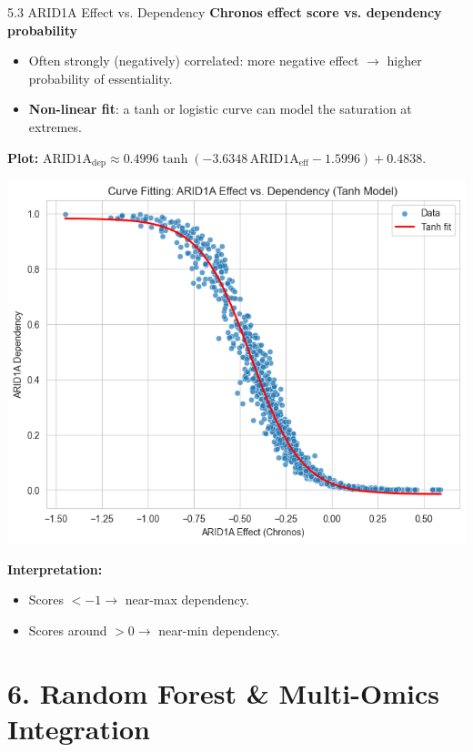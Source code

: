 \documentclass[10pt]{beamer}
\begin{document}
\begin{frame}{5.3 ARID1A Effect vs. Dependency}
  \textbf{Chronos effect score vs. dependency probability}
  \begin{itemize}
    \item Often strongly (negatively) correlated: more negative effect $\to$ higher probability of essentiality.
    \item \textbf{Non-linear fit}: a tanh or logistic curve can model the saturation at extremes.
  \end{itemize}

  \vspace{0.05cm}
  \textbf{Plot:} $\mathrm{ARID1A}_{\mathrm{dep}} \approx 0.4996\tanh(-3.6348\,\mathrm{ARID1A}_{\mathrm{eff}} - 1.5996) + 0.4838$.
    \begin{center}
      \includegraphics[width=0.6\linewidth]{figs/arid1a_scatter_tanh.png}
    \end{center}

  \vspace{0.05cm}
  \textbf{Interpretation:} 
  \begin{itemize}
    \item Scores $<-1 \to$ near-max dependency.
    \item Scores around $>0 \to$ near-min dependency.
  \end{itemize}
\end{frame}

\section{6. Random Forest \& Multi-Omics Integration}
\end{document}
